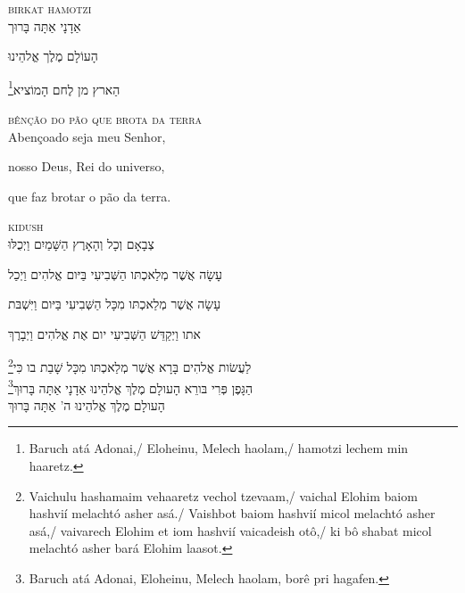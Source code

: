 \movetoevenpage
\raggedleft


\vspace*{1cm}

\textsc{birkat hamotzi}\\[15pt]

אַדָנָי אַתָּה בָּרוּך

הָעוֹלָם מֶלֶך אֱלהֵינוּ 

\footnote{Baruch atá Adonai,/ Eloheinu, Melech haolam,/ hamotzi lechem min haaretz.}הַארץ מן לֶחם הָמוֹציא

\movetooddpage
\raggedright

\vspace*{1cm}

\textsc{bênção do pão que brota da terra}\\[15pt]

Abençoado seja meu Senhor,

nosso Deus, Rei do universo,

que faz brotar o pão da terra.


\movetoevenpage
\raggedleft


\vspace*{1cm}

\textsc{kidush}\\[15pt]

צְבָאָם וְכָל וְהָאָרֶץ הַשָּׁמַיִם וַיְכֻלּוּ 

עָשָׂה אֲשֶׁר מְלַאכְתּו הַשְּׁבִיעִי בַּיּום אֱלהִים וַיְכַל 

עָשָׂה אֲשֶׁר מְלַאכְתּו מִכָּל הַשְּׁבִיעִי בַּיּום וַיִּשְׁבּת 

אתו וַיְקַדֵּשׁ הַשְּׁבִיעִי יום אֶת אֱלהִים וַיְבָרֶךְ 

\footnote{Vaichulu hashamaim vehaaretz vechol tzevaam,/ vaichal Elohim baiom hashvií melachtó asher asá./ Vaishbot baiom hashvií micol melachtó asher asá,/ vaivarech Elohim et iom hashvií vaicadeish otô,/ ki bô shabat micol melachtó asher bará Elohim laasot.}לַעֲשׂות אֱלהִים בָּרָא אֲשֶׁר מְלַאכְתּו מִכָּל שָׁבַת בו כִּי\\[10pt] 

\footnote{Baruch atá Adonai, Eloheinu, Melech haolam, borê pri hagafen.}הַגָּפֶן פְּרִי בּורֵא הָעולָם מֶלֶךְ אֱלהֵינוּ אַדָנָי אַתָּה בָּרוּךְ\\[10pt] 

הָעולָם מֶלֶךְ אֱלהֵינוּ ה' אַתָּה בָּרוּךְ

